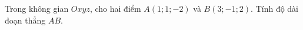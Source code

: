 \begin{ex}
Trong không gian $Oxyz$, cho hai điểm $A(1;1;-2)$ và $B(3;-1;2)$. Tính độ dài đoạn thẳng $AB$.
\end{ex}

